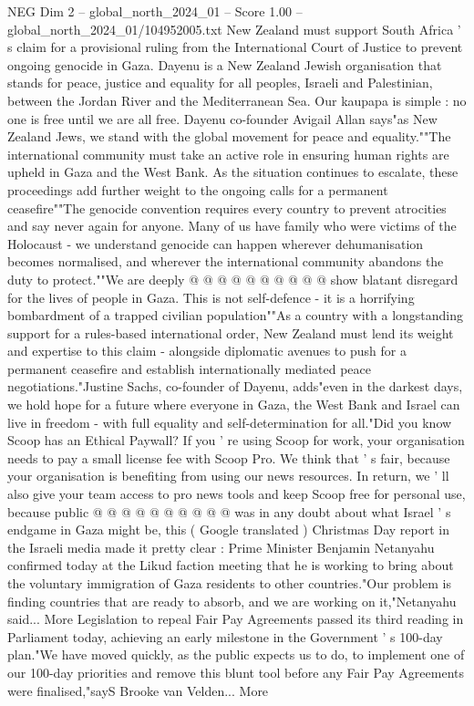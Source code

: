 \begin{textsample}{NEG Dim 2 – global\_north\_2024\_01 – Score 1.00 – global\_north\_2024\_01/104952005.txt}  \label{ex:f2_neg_343}
New Zealand must support South Africa ' s claim for a provisional ruling from the International Court of Justice to prevent ongoing genocide in Gaza.
Dayenu is a New Zealand Jewish organisation that stands for peace, justice and equality for all peoples, Israeli and Palestinian, between the Jordan River and the Mediterranean Sea.
Our kaupapa is simple : no one is free until we are all free.
Dayenu co-founder Avigail Allan says"as New Zealand Jews, we stand with the global movement for peace and equality.""The international community must take an active role in ensuring human rights are upheld in Gaza and the West Bank.
As the situation continues to escalate, these proceedings add further weight to the ongoing calls for a permanent ceasefire""The genocide convention requires every country to prevent atrocities and say never again for anyone.
Many of us have family who were victims of the Holocaust - we understand genocide can happen wherever dehumanisation becomes normalised, and wherever the international community abandons the duty to protect.""We are deeply @ @ @ @ @ @ @ @ @ @ show blatant disregard for the lives of people in Gaza.
This is not self-defence - it is a horrifying bombardment of a trapped civilian population""As a country with a longstanding support for a rules-based international order, New Zealand must lend its weight and expertise to this claim - alongside diplomatic avenues to push for a permanent ceasefire and establish internationally mediated peace negotiations."Justine Sachs, co-founder of Dayenu, adds"even in the darkest days, we hold hope for a future where everyone in Gaza, the West Bank and Israel can live in freedom - with full equality and self-determination for all."Did you know Scoop has an Ethical Paywall?
If you ' re using Scoop for work, your organisation needs to pay a small license fee with Scoop Pro.
We think that ' s fair, because your organisation is benefiting from using our news resources.
In return, we ' ll also give your team access to pro news tools and keep Scoop free for personal use, because public @ @ @ @ @ @ @ @ @ @ was in any doubt about what Israel ' s endgame in Gaza might be, this ( Google translated ) Christmas Day report in the Israeli media made it pretty clear : Prime Minister Benjamin Netanyahu confirmed today at the Likud faction meeting that he is working to bring about the voluntary immigration of Gaza residents to other countries."Our problem is finding countries that are ready to absorb, and we are working on it,"Netanyahu said...
More Legislation to repeal Fair Pay Agreements passed its third reading in Parliament today, achieving an early milestone in the Government ' s 100-day plan."We have moved quickly, as the public expects us to do, to implement one of our 100-day priorities and remove this blunt tool before any Fair Pay Agreements were finalised,"sayS Brooke van Velden...
More

\end{textsample}
